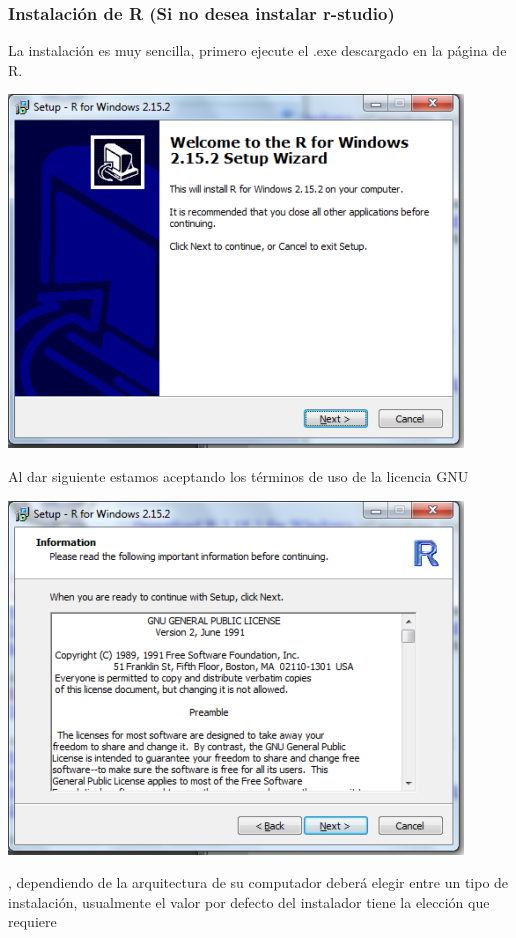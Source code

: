 \documentclass[12pt,hidelinks]{article}
\begin{document}
	\subsubsection{Instalación de R (Si no desea instalar r-studio)}
	La instalación es muy sencilla, primero ejecute el .exe descargado en la página de R.
	\begin{center}
		\includegraphics[scale=0.9]{images/1/install3-1.png}
	\end{center}
	Al dar siguiente estamos aceptando los términos de uso de la licencia GNU
	\begin{center}
		\includegraphics[scale=0.9]{images/1/install3-2.png}
	\end{center}
	, dependiendo de la arquitectura de su computador deberá elegir entre un tipo de instalación, usualmente el valor por defecto del instalador tiene la elección que requiere
\end{document}
